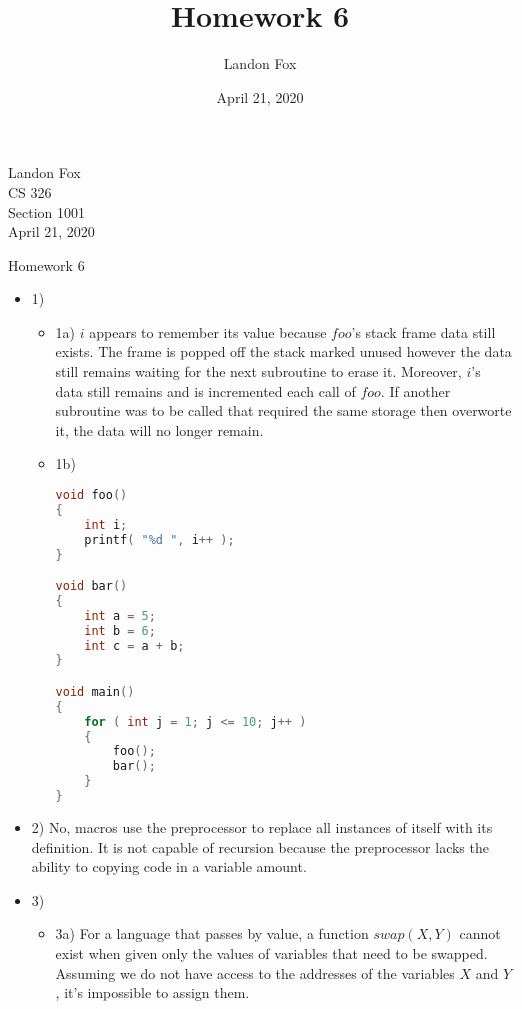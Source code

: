 \documentclass[ 12pt ]{article}
\begin{document}
\title{Homework 6}
\author{Landon Fox}
\date{April 21, 2020}

\begin{flushleft}
Landon Fox \\
CS 326 \\
Section 1001 \\
April 21, 2020
\end{flushleft}
\begin{center}
\Large Homework 6
\end{center}

\begin{itemize}
	\item[] {\large 1)}
	\begin{itemize}
		\item[] {\large 1a)}
		$i$ appears to remember its value because $foo$'s stack frame data still exists. The frame is popped off the stack marked unused
		however the data still remains waiting for the next subroutine to erase it. Moreover, $i$'s data still remains and is
		incremented each call of $foo$. If another subroutine was to be called that required the same storage then overworte it, the data 
		will no longer remain.

		\item[] {\large 1b)}
		\begin{lstlisting}[language=C]
void foo() 
{
	int i;
	printf( "%d ", i++ );
}

void bar()
{
	int a = 5;
	int b = 6;
	int c = a + b;
}

void main() 
{
	for ( int j = 1; j <= 10; j++ )
	{
		foo();
		bar();
	}
}
		\end{lstlisting}

	\end{itemize}

	\item[] {\large 2)}
	No, macros use the preprocessor to replace all instances of itself with its definition. It is not capable of recursion because
	the preprocessor lacks the ability to copying code in a variable amount.

	\item[] {\large 3)}
	\begin{itemize}
		\item[] {\large 3a)}
		For a language that passes by value, a function $swap(X,Y)$ cannot exist when given only the values of variables that need to be
		swapped. Assuming we do not have access to the addresses of the variables $X$ and $Y$, it's impossible to assign them.


\end{itemize}
\end{itemize}
\end{document}
